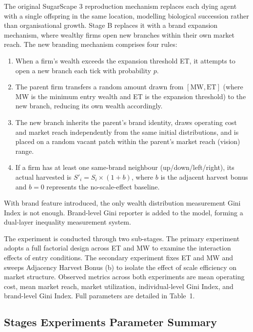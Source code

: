 \documentclass{article}
\begin{document}
The original SugarScape 3 reproduction mechanism replaces each dying agent with a single offspring in the same location, modelling biological succession rather than organisational growth. Stage B replaces it with a brand expansion mechanism, where wealthy firms open new branches within their own market reach. The new branding mechanism comprises four rules: 

\begin{enumerate}
    \item When a firm’s wealth exceeds the expansion threshold ET, it attempts to open a new branch each tick with probability $p$.
    
    \item The parent firm transfers a random amount drawn from  $[\text{MW}, \text{ET}]$ (where MW is the minimum entry wealth and ET is the expansion threshold) to the new branch, reducing its own wealth accordingly.
    
    \item The new branch inherits the parent's brand identity, draws operating cost and market reach independently from the same initial distributions, and is placed on a random vacant patch within the parent's market reach (vision) range.
    
    \item If a firm has at least one same-brand neighbour (up/down/left/right), its actual harvested is $S'_i = S_i \times (1 + b)$, where $b$ is the adjacent harvest bonus and $b = 0$ represents the no-scale-effect baseline.
\end{enumerate}
With brand feature introduced, the only wealth distribution measurement Gini Index is not enough. Brand-level Gini reporter is added to the model, forming a dual-layer inequality measurement system.

The experiment is conducted through two sub-stages. The primary experiment adopts a full factorial design across ET and MW to examine the interaction effects of entry conditions. The secondary experiment fixes ET and MW and sweeps Adjacency Harvest Bonus (b) to isolate the effect of scale efficiency on market structure. Observed metrics across both experiments are mean operating cost, mean market reach, market utilization, individual-level Gini Index, and brand-level Gini Index. Full parameters are detailed in Table~1.



\subsection{Stages Experiments Parameter Summary}
\end{document}
